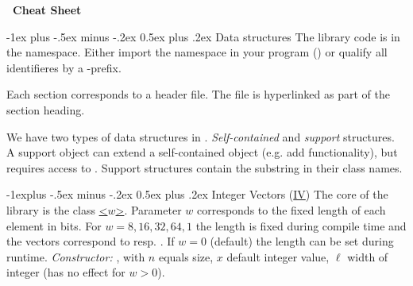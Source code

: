 \documentclass[10pt,landscape]{article}
\makeatletter
\renewcommand{\section}{\@startsection{section}{1}{0mm}%
                                {-1ex plus -.5ex minus -.2ex}%
                                {0.5ex plus .2ex}%
                                {\normalfont\large\bfseries}}
\renewcommand{\subsection}{\@startsection{subsection}{2}{0mm}%
                                {-1explus -.5ex minus -.2ex}%
                                {0.5ex plus .2ex}%
                                {\normalfont\normalsize\bfseries}}
\makeatother
\begin{document}
\begin{multicols}{3}
\newcommand{\sdsllcpbitcompressed}{\code{lcp\_bitcompressed}}
\newcommand{\sdsllcpdac}{\code{lcp\_dac}}
\newcommand{\sdsllcpvlc}{\code{lcp\_vlc}}
\newcommand{\sdsllcpbyte}{\code{lcp\_byte}}
\newcommand{\sdsllcpsupportsada}{\code{lcp\_support\_sada}}
\newcommand{\sdsllcpwt}{\code{lcp\_wt}}
\newcommand{\sdsllcpsupporttree}{\code{lcp\_support\_tree}}
\newcommand{\sdsllcpsupporttreeII}{\code{lcp\_support\_tree2}}
\newcommand{\sdslbpsupportg}{\code{bp\_support\_g}}
\newcommand{\sdslbpsupportgg}{\code{bp\_support\_gg}}
\newcommand{\sdslbpsupportsada}{\code{bp\_support\_sada}}
\newcommand{\sdslcstsada}{\code{cst\_sada}}
\newcommand{\sdslcstsctIII}{\code{cst\_sct3}}
\newcommand{\sdslrmqsupportsparsetable}{\code{rmq\_support\_sparse\_table}}
\newcommand{\sdslrmqsuccinctsada}{\code{rmq\_succint\_sada}}
\newcommand{\sdslrmqsuccinctsct}{\code{rmq\_succint\_sct}}

\newcommand{\myYES}{$\checkmark$}
\newcommand{\myNO}{$\times$}

\begin{center}
     \Large{\textbf{\sdsl\ Cheat Sheet}} \\
\end{center}

\section{Data structures}
The library code is in the  namespace. Either import
the namespace in your program () or
qualify all identifieres by a -prefix.

Each section corresponds to a header file. The file
is hyperlinked as part of the section heading.

We have two types of data structures in \sdsl.
\emph{Self-contained} and \emph{support}
structures. A support object  can extend
a self-contained object  (e.g. add functionality), but 
requires access to . Support structures contain
the substring  in their class names.

\subsection{Integer Vectors (\href{\sdslgitinc/vectors.hpp}{IV})}
The core of the library is the class 
\href{\sdslgitinc/int_vector.hpp}{\sdslintvector\textless$w$\textgreater}.
Parameter $w$ corresponds to the fixed length of each
element in bits.  For $w=8,16,32,64,1$ the length is
fixed during compile time and the vectors
correspond to \href{http://www.sgi.com/tech/stl/Vector.html}{}
resp. .
If $w=0$ (default) the length can be set during runtime.
\textit{Constructor:} \sdslintvectorZ{}, with 
$n$ equals size, $x$ default integer value, $\ell$ width
of integer (has no effect for $w>0$).


\end{multicols}
\end{document}
